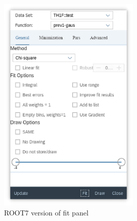 \documentclass[a4paper]{jpconf}
\begin{document}
\begin{figure}[h]
  \centering
\begin{minipage}{14pc}
\includegraphics[width=16pc]{rfitpanel1.eps}
\caption{\label{label}ROOT7 version of fit panel}
\end{minipage}\hspace{2pc}%
\begin{minipage}{14pc}

\end{minipage}
\end{figure}
\end{document}
